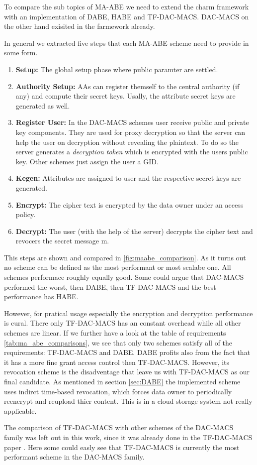 To compare the sub topics of \ac{MA-ABE} we need to extend the charm framework with an implementation of \ac{DABE}, \ac{HABE} and \ac{TF-DAC-MACS}. \ac{DAC-MACS} on the other hand exisited in the farmework already. 

In general we extracted five steps that each \ac{MA-ABE} scheme need to provide in some form. 
\begin{enumerate}
	\item \textbf{Setup:} The global setup phase where public paramter are settled.
	\item \textbf{Authority Setup:} \ac{AA}s can register themself to the central authority (if any) and compute their secret keys. Usally, the attribute secret keys are generated as well. 
	\item \textbf{Register User:} In the \ac{DAC-MACS} schemes user receive public and private key components. They are used for proxy decryption so that the server can help the user on decryption without revealing the plaintext. To do so the server generates a \textit{decryption token} which is encrypted with the users public key. Other schemes just assign the user a \ac{GID}. 
	\item \textbf{Kegen:} Attributes are assigned to user and the respective secret keys are generated.
	\item \textbf{Encrypt:} The cipher text is encrypted by the data owner under an access policy.
	\item \textbf{Decrypt:} The user (with the help of the server) decrypts the cipher text and revocers the secret message m. 
\end{enumerate}

This steps are shown and compared in \ref{fig:maabe_comparison}. As it turns out no scheme can be defined as the most performant or most scalabe one. All schemes performace roughly equally good. Some could argue that \ac{DAC-MACS} performed the worst, then \ac{DABE}, then \ac{TF-DAC-MACS} and the best performance has \ac{HABE}. 

However, for pratical usage especially the encryption and decryption performance is cural. There only \ac{TF-DAC-MACS} has an constant overhead while all other schemes are linear. If we further have a look at the table of requirements \ref{tab:ma_abe_comparisons}, we see that only two schemes satisfy all of the requirements: \ac{TF-DAC-MACS} and \ac{DABE}. \ac{DABE} profits also from the fact that it has a more fine grant access control then \ac{TF-DAC-MACS}. However, its revocation scheme is the disadventage that leave us with \ac{TF-DAC-MACS} as our final candidate. As mentioned in section \ref{sec:DABE} the implemented scheme uses indirct time-based revocation, which forces data owner to periodically reencrypt and reupload thier content. This is in a cloud storage system not really applicable. 

The comparison of \ac{TF-DAC-MACS} with other schemes of the \ac{DAC-MACS} family was left out in this work, since it was already done in the \ac{TF-DAC-MACS} paper \cite{li2017two}. Here some could easly see that \ac{TF-DAC-MACS} is currently the most performant scheme in the \ac{DAC-MACS} family.  